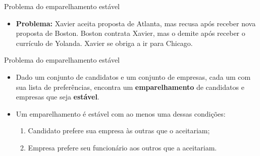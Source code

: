 \begin{frame}[t]{Problema do emparelhamento estável}
	\pause

	\vspace{-20pt}

	\begin{itemize}
		\item \textbf{Problema:} Xavier aceita proposta de Atlanta, mas recusa após receber nova proposta de Boston. Boston contrata Xavier, mas o demite após receber o currículo de Yolanda. Xavier se obriga a ir para Chicago.
	\end{itemize}

\end{frame}



\begin{frame}{Problema do emparelhamento estável}
	
	\begin{itemize}
		\item Dado um conjunto de candidatos e um conjunto de empresas, cada um com sua lista de preferências, encontra um \textbf{emparelhamento} de candidatos e empresas que seja \textbf{estável}.
		
		\item Um emparelhamento é estável com ao menos uma dessas condições:
		\begin{enumerate}
			\item Candidato prefere sua empresa às outras que o aceitariam;
			\item Empresa prefere seu funcionário aos outros que a aceitariam.
		\end{enumerate}
	\end{itemize}

	\captionsetup[table]{skip=2pt}
	

\end{frame}
